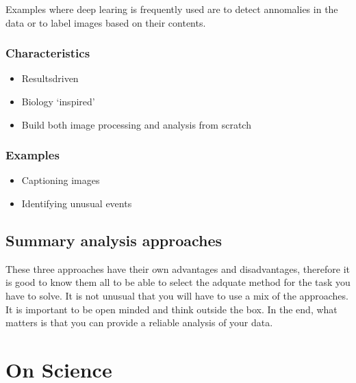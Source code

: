 \documentclass[letterpaper,10pt,english]{sphinxmanual}
\begin{document}
\sphinxAtStartPar
Examples where deep learing is frequently used are to detect annomalies in the data or to label images based on their contents.




\subsection{Characteristics}
\label{\detokenize{01-Introduction:id3}}\begin{itemize}
\item {} 
\sphinxAtStartPar
Results\sphinxhyphen{}driven

\item {} 
\sphinxAtStartPar
Biology ‘inspired’

\item {} 
\sphinxAtStartPar
Build both image processing and analysis from scratch

\end{itemize}


\subsection{Examples}
\label{\detokenize{01-Introduction:id4}}\begin{itemize}
\item {} 
\sphinxAtStartPar
Captioning images

\item {} 
\sphinxAtStartPar
Identifying unusual events

\end{itemize}




\section{Summary analysis approaches}
\label{\detokenize{01-Introduction:summary-analysis-approaches}}
\sphinxAtStartPar
These three approaches have their own advantages and disadvantages, therefore it is good to know them all to be able to select the adquate method for the task you have to solve. It is not unusual that you will have to use a mix of the approaches. It is important to be open minded and think outside the box. In the end, what matters is that you can provide a reliable analysis of your data.


\chapter{On Science}
\label{\detokenize{01-Introduction:on-science}}
\end{document}
